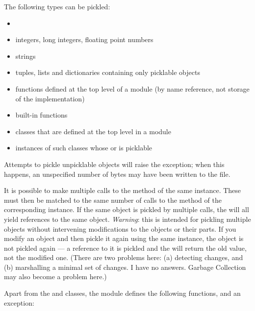 The following types can be pickled:

\begin{itemize}

\item {}

\item integers, long integers, floating point numbers

\item strings

\item tuples, lists and dictionaries containing only picklable objects

\item functions defined at the top level of a module (by name
      reference, not storage of the implementation)

\item built-in functions

\item classes that are defined at the top level in a module

\item instances of such classes whose  or
 is picklable

\end{itemize}

Attempts to pickle unpicklable objects will raise the
 exception; when this happens, an unspecified
number of bytes may have been written to the file.

It is possible to make multiple calls to the  method of
the same  instance.  These must then be matched to the
same number of calls to the  method of the
corresponding  instance.  If the same object is
pickled by multiple  calls, the  will all
yield references to the same object.  \emph{Warning}: this is intended
for pickling multiple objects without intervening modifications to the
objects or their parts.  If you modify an object and then pickle it
again using the same  instance, the object is not
pickled again --- a reference to it is pickled and the
 will return the old value, not the modified one.
(There are two problems here: (a) detecting changes, and (b)
marshalling a minimal set of changes.  I have no answers.  Garbage
Collection may also become a problem here.)

Apart from the  and  classes, the
module defines the following functions, and an exception:

